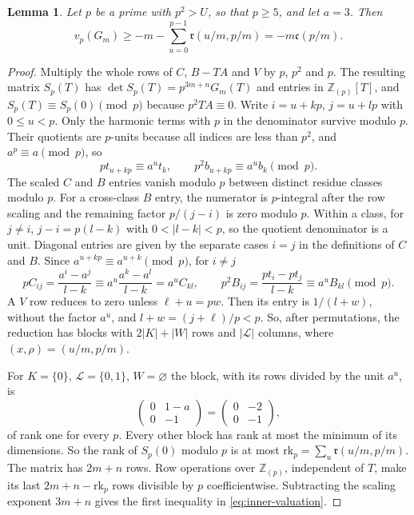 \documentclass{amsart}
\newtheorem{lemma}{Lemma}[section]
\numberwithin{equation}{section}
\numberwithin{table}{section}
\newcommand{\Z}{\mathbb{Z}}
\begin{document}
\begin{lemma}\label{lem:residue-bound}
Let $p$ be a prime with $p^2>U$, so that $p\ge5$, and let $a=3$. Then
\begin{equation}\label{eq:inner-valuation}
 v_p(G_m)\ge-m-\sum_{u=0}^{p-1}\mathfrak r(u/m,p/m)=-m\mathfrak c(p/m).
\end{equation}
\end{lemma}
\begin{proof}
Multiply the whole rows of $C$, $B-TA$ and $V$ by $p$, $p^2$ and $p$. The
resulting matrix $S_p(T)$ has $\det S_p(T)=p^{3m+n}G_m(T)$ and entries in
$\Z_{(p)}[T]$, and $S_p(T)\equiv S_p(0)\pmod p$ because $p^2TA\equiv0$.
Write $i=u+kp$, $j=u+lp$ with
$0\le u<p$. Only the harmonic terms with $p$ in the denominator survive
modulo $p$. Their quotients are $p$-units because all indices are less than
$p^2$, and $a^p\equiv a\pmod p$, so
\[
 pt_{u+kp}\equiv a^ut_k,\qquad p^2b_{u+kp}\equiv a^ub_k\pmod p.
\]
The scaled $C$ and $B$ entries vanish modulo $p$ between distinct residue
classes modulo $p$. For a cross-class $B$ entry, the numerator is $p$-integral after
the row scaling and the remaining factor $p/(j-i)$ is zero modulo $p$.
Within a class, for $j\ne i$, $j-i=p(l-k)$ with $0<|l-k|<p$, so the
quotient denominator is a unit. Diagonal entries are given by the separate
cases $i=j$ in the definitions of $C$ and $B$. Since $a^{u+kp}\equiv a^{u+k}\pmod p$, for $i\ne j$
\[
 pC_{ij}=\frac{a^i-a^j}{l-k}\equiv a^u\frac{a^k-a^l}{l-k}=a^uC_{kl},\qquad
 p^2B_{ij}=\frac{pt_i-pt_j}{l-k}\equiv a^uB_{kl}\pmod p.
\]
A $V$ row reduces to zero unless $\ell+u=pw$. Then its
entry is $1/(l+w)$, without the factor $a^u$, and $l+w=(j+\ell)/p<p$. So,
after permutations, the reduction has blocks
with $2|K|+|W|$ rows and $|\mathcal L|$ columns, where $(x,\rho)=(u/m,p/m)$.

For $K=\{0\}$, $\mathcal L=\{0,1\}$, $W=\varnothing$ the block, with its rows
divided by the unit $a^u$, is
\begin{equation}\label{eq:rank-one-block}
 \begin{pmatrix}0&1-a\\0&-1\end{pmatrix}
 =\begin{pmatrix}0&-2\\0&-1\end{pmatrix},
\end{equation}
of rank one for every $p$. Every other block has rank at most the
minimum of its dimensions. So the rank of $S_p(0)$ modulo $p$ is at most
$\mathrm{rk}_p=\sum_u \mathfrak r(u/m,p/m)$.
The matrix has $2m+n$ rows. Row operations over $\Z_{(p)}$, independent of
$T$, make its last $2m+n-\mathrm{rk}_p$ rows divisible by $p$ coefficientwise.
Subtracting the scaling exponent $3m+n$ gives the first inequality in
\eqref{eq:inner-valuation}.


\end{proof}
\end{document}
